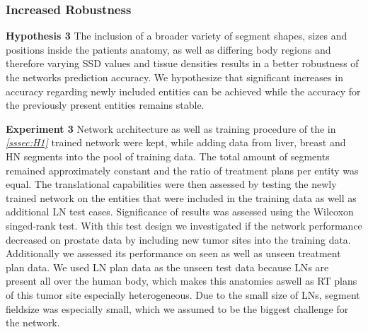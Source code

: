 \subsubsection{Increased Robustness}\label{sssec:H3}
\begin{hanginglist}\itemsep2pt

    \item\textbf{Hypothesis 3}\newline
    The inclusion of a broader variety of segment shapes, sizes and positions inside the patients anatomy, as well as differing body regions and therefore varying \acs{SSD} values and tissue densities results in a better robustness of the networks prediction accuracy.
    We hypothesize that significant increases in accuracy regarding newly included entities can be achieved while the accuracy for the previously present entities remains stable.\\

    \item\textbf{Experiment 3}\newline
    Network architecture as well as training procedure of the in \emph{\ref{sssec:H1} } trained network were kept, while adding data from liver, breast and \acs{HN} segments into the pool of training data. 
    The total amount of segments remained approximately constant and the ratio of treatment plans per entity was equal.
    The translational capabilities were then assessed by testing the newly trained network on the entities that were included in the training data as well as additional \ac{LN} test cases. 
    Significance of results was assessed using the Wilcoxon singed-rank test.
    With this test design we investigated if the network performance decreased on prostate data by including new tumor sites into the training data.
    Additionally we assessed its performance on seen as well as unseen treatment plan data.
    We used \acs{LN} plan data as the unseen test data because \acs{LN}s are present all over the human body, which makes this anatomies aswell as \acs{RT} plans of this tumor site especially heterogeneous. 
    Due to the small size of \acs{LN}s, segment fieldsize was especially small, which we assumed to be the biggest challenge for the network.\\

\end{hanginglist}

